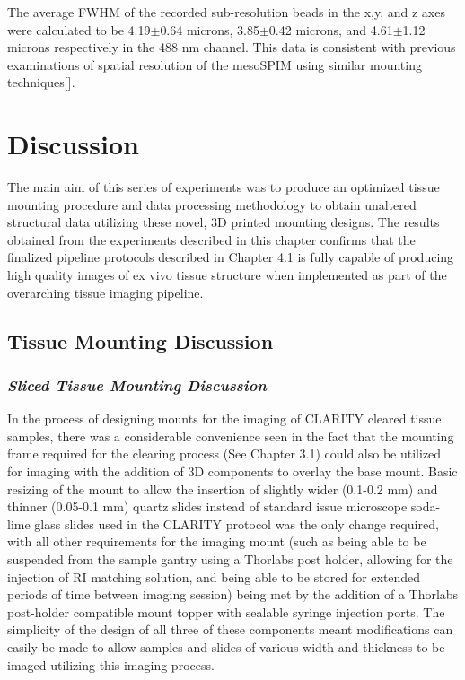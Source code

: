 The average FWHM of the recorded sub-resolution beads in the x,y, and z axes were calculated to be 4.19$\pm$0.64 microns, 3.85$\pm$0.42 microns, and 4.61$\pm$1.12 microns respectively in the 488 nm channel. This data is consistent with previous examinations of spatial resolution of the mesoSPIM using similar mounting techniques[]. 

\section{Discussion}
The main aim of this series of experiments was to produce an optimized tissue mounting procedure and data processing methodology to obtain unaltered structural data utilizing these novel, 3D printed mounting designs. The results obtained from the experiments described in this chapter confirms that the finalized pipeline protocols described in Chapter 4.1 is fully capable of producing high quality images of ex vivo tissue structure when implemented as part of the overarching tissue imaging pipeline. 

\subsection{Tissue Mounting Discussion}
\subsubsection{\textit{Sliced Tissue Mounting Discussion}}
In the process of designing mounts for the imaging of CLARITY cleared tissue samples, there was a considerable convenience seen in the fact that the mounting frame required for the clearing process (See Chapter 3.1) could also be utilized for imaging with the addition of 3D components to overlay the base mount. Basic resizing of the mount to allow the insertion of slightly wider (0.1-0.2 mm) and thinner (0.05-0.1 mm) quartz slides instead of standard issue microscope soda-lime glass slides used in the CLARITY protocol was the only change required, with all other requirements for the imaging mount (such as being able to be suspended from the sample gantry using a Thorlabs post holder, allowing for the injection of RI matching solution, and being able to be stored for extended periods of time between imaging session) being met by the addition of a Thorlabs post-holder compatible mount topper with sealable syringe injection ports. The simplicity of the design of all three of these components meant modifications can easily be made to allow samples and slides of various width and thickness to be imaged utilizing this imaging process. 

